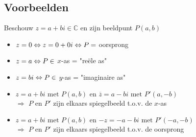 \documentclass[12pt,twoside]{article}
\begin{document}
\subsection{Voorbeelden}

Beschouw $z=a+bi\in\mathbb{C}$ en zijn beeldpunt $P(a,b)$

\begin{itemize}
  \item $z=0 \Leftrightarrow z=0+0i \Leftrightarrow P=$ oorsprong
  \item $z=a \Leftrightarrow P\in $ $x$-as = "reële as"
  \item $z=bi \Leftrightarrow P\in $ $y$-as = "imaginaire as"
  \item $z=a+bi \text{ met } P(a,b)$ en $\overline{z}=a-bi \text{ met } P'(a,-b)$\\
  $\Rightarrow$ $P$ en $P'$ zijn elkaars spiegelbeeld t.o.v. de $x$-as
  \item $z=a+bi \text{ met } P(a,b)$ en $-z=-a-bi \text{ met } P'(-a,-b)$\\
  $\Rightarrow$ $P$ en $P'$ zijn elkaars spiegelbeeld t.o.v. de oorsprong
\end{itemize}
\end{document}
